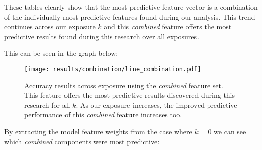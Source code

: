 These tables clearly show that the most predictive feature vector is a combination of the individually most predictive 
features found during our analysis. This trend continues across our exposure $k$ and this \emph{combined} feature offers the most predictive results 
found during this research over all exposures.

This can be seen in the graph below:

\clearpage

\begin{figure}[h]
	\begin{center}
		\texttt{[image: results/combination/line\_combination.pdf]}
		\caption{Accuracy results across exposure using the \emph{combined} feature set. This feature offers the most predictive 
				 results discovered during this research for all $k$. As our exposure increases, the improved predictive performance of this 
				 \emph{combined} feature increases too.}
	\end{center}
\end{figure}

\clearpage

By extracting the model feature weights from the case where $k=0$ we can see which \emph{combined} components 
were most predictive:

